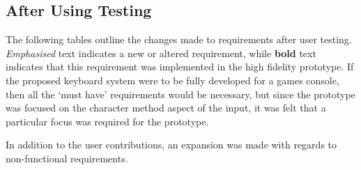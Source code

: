 \documentclass[requirements.tex]{subfiles}
\begin{document}
\subsection{After Using Testing} %
The following tables outline the changes made to requirements after user
testing. \emph{Emphasised} text indicates a new or altered requirement, while
\textbf{bold} text indicates that this requirement was implemented in the high
fidelity prototype. If the proposed keyboard system were to be fully developed
for a games console, then all the `must have' requirements would be necessary,
but since the prototype was focused on the character method aspect of the
input, it was felt that a particular focus was required for the prototype.

In addition to the user contributions, an expansion was made with regards to
non-functional requirements.
\end{document}
